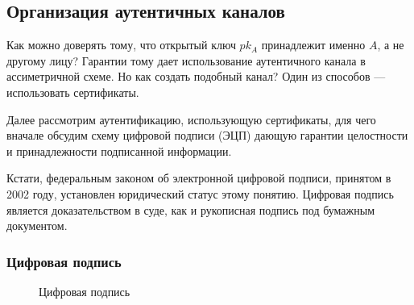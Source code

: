\subsection{Организация аутентичных каналов}


Как можно доверять тому, что открытый ключ $pk_A$ принадлежит именно $A$, а не другому лицу? Гарантии тому дает использование аутентичного канала в ассиметричной схеме. Но как создать подобный канал? Один из способов --- использовать сертификаты.

Далее рассмотрим аутентификацию, использующую сертификаты, для чего вначале обсудим схему цифровой подписи (ЭЦП) дающую гарантии целостности и принадлежности подписанной информации.

Кстати, федеральным законом об электронной  цифровой подписи, принятом в 2002 году, установлен юридический статус этому понятию. Цифровая подпись является доказательством в суде, как и рукописная подпись под бумажным документом. 


\begin{frame}
    \frametitle{Цифровая подпись}
    \begin{figure}
        \begin{center}
        \end{center}
        \caption{Цифровая подпись}\label{pict:signature}
    \end{figure} 
\end{frame}

